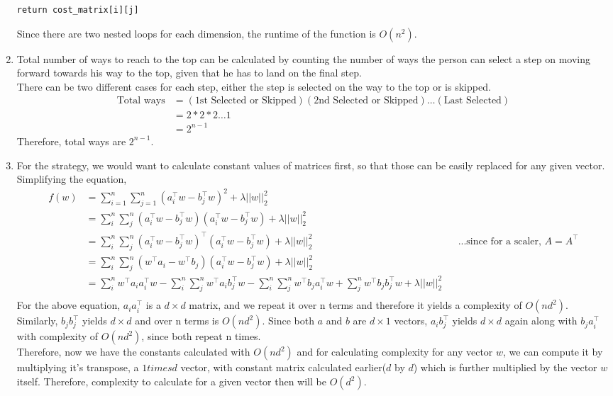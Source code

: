 \documentclass[12pt]{article}
\begin{document}
\begin{enumerate}[label=(\alph*)]
\begin{lstlisting}[basicstyle=\small]
    return cost_matrix[i][j]
\end{lstlisting}
Since there are two nested loops for each dimension, the runtime of the function is $O(n^2)$.\\
\linebreak
\item Total number of ways to reach to the top can be calculated by counting the number of ways the person can select a step on moving forward towards his way to the top, given that he has to land on the final step. \\
\linebreak
There can be two different cases for each step, either the step is selected on the way to the top or is skipped. \\
\begin{align*}
\text{Total ways} & = (\text{1st Selected or Skipped}) (\text{2nd Selected or Skipped}) \dots (\text{Last Selected}) \\ 
&= 2 * 2 * 2 \dots 1 \\
& = 2^{n-1}
\end{align*}
Therefore, total ways are $2^{n-1}$.\\
\linebreak
\item For the strategy, we would want to calculate constant values of matrices first, so that those can be easily replaced for any given vector. Simplifying the equation, \\
\begin{align*}
f(w) & = \sum_{i=1}^{n}\sum_{j=1}^{n} (a_i^\top w - b_j^\top w)^2 + \lambda||w||_2^2 \\
& = \sum_i^n \sum_j^n (a_i^\top w - b_j^\top w) (a_i^\top w - b_j^\top w) + \lambda||w||_2^2 \\
& = \sum_i^n \sum_j^n (a_i^\top w - b_j^\top w)^\top (a_i^\top w - b_j^\top w) + \lambda||w||_2^2 && \text{...since for a scaler, $A = A^\top$} \\
& = \sum_i^n \sum_j^n ( w^\top a_i - w^\top b_j ) (a_i^\top w - b_j^\top w) + \lambda||w||_2^2 \\
& = \sum_i^n w^\top a_i a_i^\top w - \sum_i^n \sum_j^n w^\top a_i b_j^\top w - \sum_i^n \sum_j^n w^\top b_j a_i^\top w + \sum_j^n w^\top b_j b_j^\top w + \lambda||w||_2^2 \\
\end{align*} 
For the above equation, $a_i a_i^\top$ is a $d \times d$ matrix, and we repeat it over n terms and therefore it yields a complexity of $O(nd^2)$. \\
Similarly, $b_j b_j^\top$ yields $d \times d$ and over n terms is $O(nd^2)$. Since both $a$ and $b$ are $d \times 1$ vectors, $a_i b_j^\top $ yields $d \times d$ again along with $b_j a_i^\top$ with complexity of $O(nd^2)$, since both repeat n times.  \\
Therefore, now we have the constants calculated with $O(nd^2)$ and for calculating complexity for any vector $w$, we can compute it by multiplying it's transpose, a $1 times d$ vector, with constant matrix calculated earlier($d$ by $d$) which is further multiplied by the vector $w$ itself. Therefore, complexity to calculate for a given vector then will be $O(d^2)$.
\end{enumerate}
\end{document}
